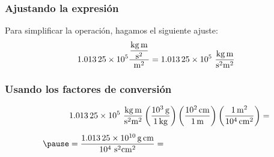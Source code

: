 \documentclass[14pt]{beamer}
\begin{document}
\begin{frame}
\frametitle{Ajustando la expresión}
Para simplificar la operación, hagamos el siguiente ajuste:
\pause
\begin{eqnarray*}
\begin{aligned}
\num{1.01325d5} \dfrac{\displaystyle \unit[per-mode=fraction]{\kilo\gram\meter\per\square\second}}{\unit{\square\meter}} = \num{1.01325d5} \, \, \dfrac{\unit{\kilo\gram\meter}}{\unit{\square\second} \unit{\square\meter}}
\end{aligned}
\end{eqnarray*}
\end{frame}
\begin{frame}
\frametitle{Usando los factores de conversión}
\begin{eqnarray*}
\begin{aligned}
&\num{1.01325d5} \, \, \dfrac{\unit{\kilo\gram\meter}}{\unit{\square\second} \unit{\square\meter}} \left( \dfrac{\SI{d3}{\gram}}{\SI{1}{\kilo\gram}} \right) \left( \dfrac{\SI{d2}{\centi\meter}}{\SI{1}{\meter}} \right) \left( \dfrac{\SI{1}{\square\meter}}{\SI{d4}{\square\centi\meter}} \right) = \\[0.5em] \pause
&= \dfrac{\SI{1.01325d10}{\gram\centi\meter}}{\num{d4} \, \, \unit{\square\second} \unit{\square{\centi\meter}}} =
\end{aligned}
\end{eqnarray*}

\end{frame}
\end{document}

